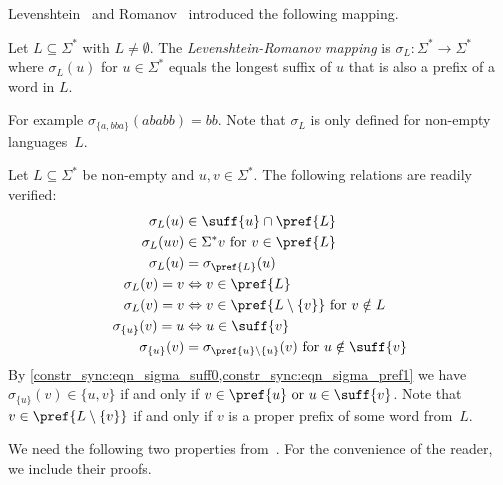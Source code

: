 
Levenshtein~\cite{Lev64} and Romanov~\cite{Rom66} introduced the following mapping.

\begin{definition} \label{def:levenshtein-romanov-mapping}
	Let $L \subseteq \Sigma^*$ with $L \ne \emptyset$. %
	The \emph{Levenshtein-Romanov mapping} is $\sigma_L \colon \Sigma^* \to \Sigma^*$
	where $\sigma_L(u)$ for $u \in \Sigma^*$ equals the longest suffix of $u$ that is also a prefix of a word in $L$.
\end{definition} 

For example $\sigma_{\{a,bba\}}(ababb) = bb$. 
Note that $\sigma_L$ is only defined for non-empty languages~$L$.

Let $L \subseteq \Sigma^*$ be non-empty and $u,v\in \Sigma^*$. The following relations
are readily verified:
\begin{align}
	\sigma_L(u) & \in \suff{u}\cap \pref{L}  \label{constrsync:eqn:sigmaL-in-suffpref} \\
	\sigma_L(uv) & \in \Sigma^*v  \text{ for } v \in \pref{L} \\
	\sigma_L(u) & = \sigma_{\pref{L}}(u) \label{constr_sync:prop:sigma_L_prefix:1} \\	
	\sigma_{L}(v) = v & \Leftrightarrow v \in \pref{L}  \label{constr_sync:eqn_sigma_pref1}  \\
	\sigma_{L}(v) = v & \Leftrightarrow v \in \pref{L\setminus \{v\}} \text{ for } v \notin L \label{constrsync:prop:suffsigma:5} \\	
	\sigma_{\{u\}}(v) = u & \Leftrightarrow u \in \suff{v} \label{constr_sync:eqn_sigma_suff0} \\
	\sigma_{\{u\}}(v)  & = \sigma_{\pref{u}\setminus \{u\}}(v) \text{ for } u \notin \suff{v}
\end{align}
By \cref{constr_sync:eqn_sigma_suff0,constr_sync:eqn_sigma_pref1} we have
$\sigma_{\{u\}}(v) \in \{u,v\}$ if and only if $v \in \pref{u} \text{ or } u \in \suff{v}$.
Note that $v \in \pref{L\setminus\{v\}}$ if and only if $v$ is a proper prefix of some word
from~$L$.

We need the following two properties
from~\cite[Prop.~2]{DBLP:journals/tcs/JurgensenS21}. For the convenience of the reader, we include their proofs.

